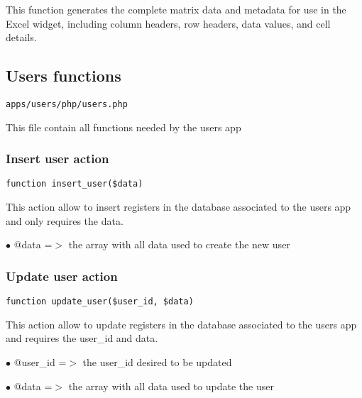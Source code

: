 \documentclass[a4paper]{article}
\begin{document}
This function generates the complete matrix data and metadata for use in
the Excel widget, including column headers, row headers, data values, and cell details.

\hypertarget{toc173}{}
\subsection{Users functions}

\begin{lstlisting}
apps/users/php/users.php
\end{lstlisting}

This file contain all functions needed by the users app

\hypertarget{toc174}{}
\subsubsection{Insert user action}

\begin{lstlisting}
function insert_user($data)
\end{lstlisting}

This action allow to insert registers in the database associated to
the users app and only requires the data.

\begin{compactitem}
\item[\color{myblue}$\bullet$] @data =$>$ the array with all data used to create the new user
\end{compactitem}

\hypertarget{toc175}{}
\subsubsection{Update user action}

\begin{lstlisting}
function update_user($user_id, $data)
\end{lstlisting}

This action allow to update registers in the database associated to
the users app and requires the user\_id and data.

\begin{compactitem}
\item[\color{myblue}$\bullet$] @user\_id =$>$ the user\_id desired to be updated
\item[\color{myblue}$\bullet$] @data    =$>$ the array with all data used to update the user
\end{compactitem}
\end{document}

